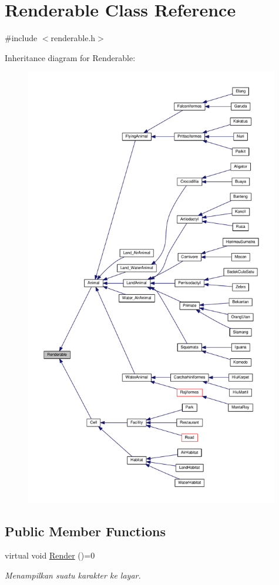 \hypertarget{classRenderable}{}\section{Renderable Class Reference}
\label{classRenderable}


{\ttfamily \#include $<$renderable.\+h$>$}



Inheritance diagram for Renderable\+:
\nopagebreak
\begin{figure}[H]
\begin{center}
\leavevmode
\includegraphics[height=550pt]{classRenderable__inherit__graph}
\end{center}
\end{figure}
\subsection*{Public Member Functions}
\begin{DoxyCompactItemize}
\item 
virtual void \hyperlink{classRenderable_a6bc986f9a3962fc06bc1c7f9b729104f}{Render} ()=0\hypertarget{classRenderable_a6bc986f9a3962fc06bc1c7f9b729104f}{}\label{classRenderable_a6bc986f9a3962fc06bc1c7f9b729104f}

\begin{DoxyCompactList}\small\item\em Menampilkan suatu karakter ke layar. \end{DoxyCompactList}\end{DoxyCompactItemize}
